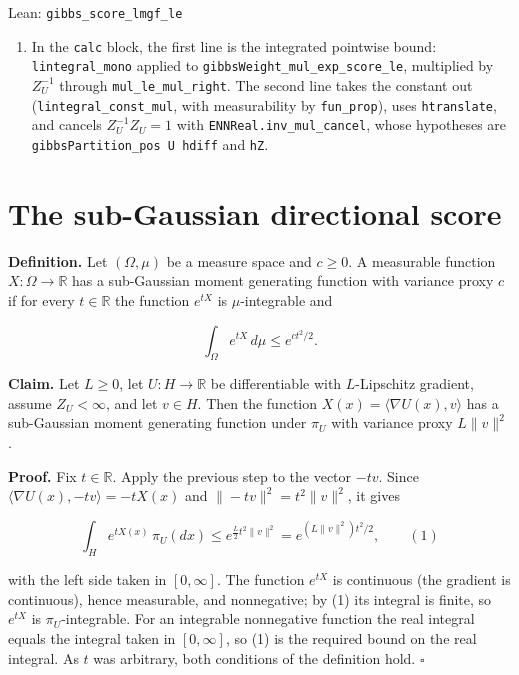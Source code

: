 \documentclass[11pt,a4paper]{article}
\begin{document}
\begin{leanbox}{Lean: \texttt{gibbs\_\allowbreak{}score\_\allowbreak{}lmgf\_\allowbreak{}le}}
\begin{enumerate}
\item In the \texttt{calc} block, the first line is the integrated pointwise bound: \texttt{lintegral\_\allowbreak{}mono} applied to \texttt{gibbs\allowbreak{}Weight\_\allowbreak{}mul\_\allowbreak{}exp\_\allowbreak{}score\_\allowbreak{}le}, multiplied by \(Z_U^{-1}\) through \texttt{mul\_\allowbreak{}le\_\allowbreak{}mul\_\allowbreak{}right}. The second line takes the constant out (\texttt{lintegral\_\allowbreak{}const\_\allowbreak{}mul}, with measurability by \texttt{fun\_\allowbreak{}prop}), uses \texttt{htranslate}, and cancels \(Z_U^{-1}Z_U=1\) with \texttt{ENNReal.\allowbreak{}inv\_\allowbreak{}mul\_\allowbreak{}cancel}, whose hypotheses are \texttt{gibbs\allowbreak{}Partition\_\allowbreak{}pos U hdiff} and \texttt{h\allowbreak{}Z}.

\end{enumerate}
\end{leanbox}

\section{\texorpdfstring{The sub-Gaussian directional score}{The sub-Gaussian directional score}}


\textbf{Definition.} Let \((\Omega,\mu)\) be a measure space and \(c\ge0\). A measurable function \(X:\Omega\to\mathbb R\) has a sub-Gaussian moment generating function with variance proxy \(c\) if for every \(t\in\mathbb R\) the function \(e^{tX}\) is \(\mu\)-integrable and


\[\int_\Omega e^{tX}\,d\mu\le e^{ct^2/2}.\]


\textbf{Claim.} Let \(L\ge0\), let \(U:H\to\mathbb R\) be differentiable with \(L\)-Lipschitz gradient, assume \(Z_U<\infty\), and let \(v\in H\). Then the function \(X(x)=\langle\nabla U(x),v\rangle\) has a sub-Gaussian moment generating function under \(\pi_U\) with variance proxy \(L\|v\|^2\).




\textbf{Proof.} Fix \(t\in\mathbb R\). Apply the previous step to the vector \(-tv\). Since \(\langle\nabla U(x),-tv\rangle=-tX(x)\) and \(\|-tv\|^2=t^2\|v\|^2\), it gives


\[\int_He^{tX(x)}\,\pi_U(dx)\le e^{\frac L2t^2\|v\|^2}=e^{(L\|v\|^2)t^2/2},\qquad(1)\]


with the left side taken in \([0,\infty]\). The function \(e^{tX}\) is continuous (the gradient is continuous), hence measurable, and nonnegative; by (1) its integral is finite, so \(e^{tX}\) is \(\pi_U\)-integrable. For an integrable nonnegative function the real integral equals the integral taken in \([0,\infty]\), so (1) is the required bound on the real integral. As \(t\) was arbitrary, both conditions of the definition hold. \(\square\)
\end{document}
